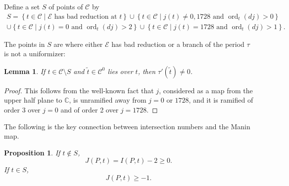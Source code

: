 \documentclass[12pt,reqno]{amsart}
\numberwithin{equation}{section}
\theoremstyle{plain}
\newtheorem{prop}[subsection]{Proposition}
\newtheorem{lemma}[subsection]{Lemma}
\theoremstyle{definition}
\theoremstyle{remark}
\newcommand{\CC}{\mathcal{C}}
\newcommand{\EE}{\mathcal{E}}
\newcommand{\C}{\mathbb{C}}
\newcommand{\<}{\langle}
\renewcommand{\>}{\rangle}
\DeclareMathOperator{\ord}{ord}
\numberwithin{equation}{section}
\begin{document}
Define a set $S$ of points of $\CC$ by
\begin{multline*}\label{eq:1}
S=\left\{t\in\CC\mid\text{$\EE$ has bad reduction at $t$}\right\}
\cup \left\{t\in\CC\mid\text{$j(t)\neq0,1728$ and $\ord_t(dj)>0$}\right\}\\  
\cup\left\{t\in\CC\mid\text{$j(t)=0$ and $\ord_t(dj)>2$}\right\}
\cup \left\{t\in\CC\mid\text{$j(t)=1728$ and $\ord_t(dj)>1$}\right\}.
\end{multline*}

The points in $S$ are where either $\EE$ has bad reduction or a
branch of the period $\tau$ is not a uniformizer:

\begin{lemma}
  If $t\in\CC\setminus S$ and $\tilde t\in\CC^0$ lies over $t$, then
  $\tau'(\tilde t)\neq0$.
\end{lemma}

\begin{proof}
This follows from the well-known fact that $j$, considered as a map
from the upper half plane to $\C$, is unramified away from $j=0$ or
$1728$, and it is ramified of order 3 over $j=0$ and of order 2 over
$j=1728$.   
\end{proof}

The following is the key connection between intersection numbers and the
Manin map.

\begin{prop}\label{prop:bounds}
  If $t\not\in S$,
  \[J(P,t)=I(P,t)-2\ge0.\]
  If $t\in S$, 
  \[J(P,t)\ge-1.\]
\end{prop}
\end{document}
